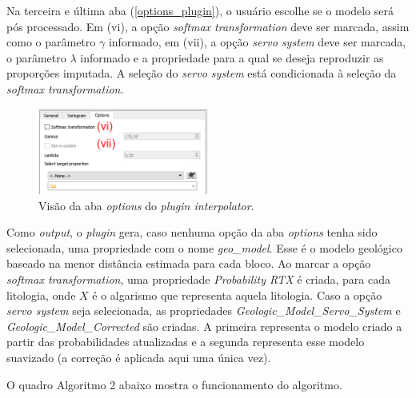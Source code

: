 Na terceira e última aba (\autoref{options_plugin}), o usuário escolhe se o modelo será pós processado. Em (vi), a opção \textit{softmax transformation} deve ser marcada, assim como o parâmetro $\gamma$ informado, em (vii), a opção \textit{servo system} deve ser marcada, o parâmetro $\lambda$ informado e a propriedade para a qual se deseja reproduzir as proporções imputada. A seleção do \textit{servo system} está condicionada à seleção da \textit{softmax transformation}. 

\begin{figure}[!ht]
	\caption{\label{options_plugin}Visão da aba \textit{options} do \textit{plugin interpolator}.}
	\begin{center}
		\includegraphics[width=0.5\textwidth]{modelagem_geologica/options_plugin}
	\end{center}
\end{figure}

Como \textit{output}, o \textit{plugin} gera, caso nenhuma opção da aba \textit{options} tenha sido selecionada, uma propriedade com o nome \textit{geo\_model}. Esse é o modelo geológico baseado na menor distância estimada para cada bloco. Ao marcar a opção \textit{softmax transformation}, uma propriedade \textit{Probability RTX} é criada, para cada litologia, onde $X$ é o algarismo que representa aquela litologia. Caso a opção \textit{servo system} seja selecionada, as propriedades \textit{Geologic\_Model\_Servo\_System} e \textit{Geologic\_Model\_Corrected} são criadas. A primeira representa o modelo criado a partir das probabilidades atualizadas e a segunda representa esse modelo suavizado (a correção é aplicada aqui uma única vez).

O quadro Algoritmo 2 abaixo mostra o funcionamento do algoritmo.

